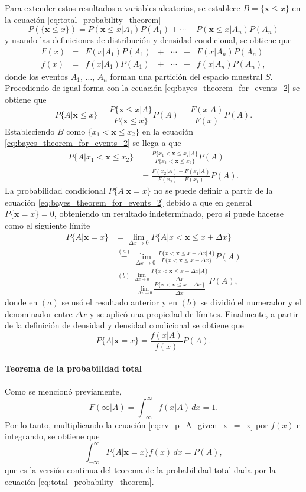 \documentclass[a4paper]{report}
\newcommand{\x}{\mathbf{x}}
\begin{document}
Para extender estos resultados a variables aleatorias, se establece \(B=\{\x\leq x\}\) en la ecuación \ref{eq:total_probability_theorem}
\[
 P(\{\x\leq x\})=P(\x\leq x|A_1)P(A_1)+\cdots+P(\x\leq x|A_n)P(A_n)
\]
y usando las definiciones de distribución y densidad condicional, se obtiene que
\[
\begin{array}{lllllll}
 F(x)&=&F(x|A_1)P(A_1)&+&\cdots&+&F(x|A_n)P(A_n)\\
 f(x)&=&f(x|A_1)P(A_1)&+&\cdots&+&f(x|A_n)P(A_n),
 \end{array}
\]
donde los eventos \(A_1,\,\dots,\,A_n\) forman una partición del espacio muestral \(S\). Procediendo de igual forma con la ecuación \ref{eq:bayes_theorem_for_events_2} se obtiene que
\[
 P\{A|\x\leq x\}=\frac{P\{\x\leq x|A\}}{P\{\x\leq x\}}P(A)=\frac{F(x|A)}{F(x)}P(A).
\]
Estableciendo \(B\) como \(\{x_1<\x\leq x_2\}\) en la ecuación \ref{eq:bayes_theorem_for_events_2} se llega a que
\begin{align*}
 P\{A|x_1<\x\leq x_2\}&=\frac{P\{x_1<\x\leq x_2|A\}}{P\{x_1<\x\leq x_2\}}P(A)\\
    &=\frac{F(x_2|A)-F(x_1|A)}{F(x_2)-F(x_1)}P(A).
\end{align*}
La probabilidad condicional \(P\{A|\x = x\}\) no se puede definir a partir de la ecuación \ref{eq:bayes_theorem_for_events_2} debido a que en general \(P\{\x = x\}=0\), obteniendo un resultado indeterminado, pero si puede hacerse como el siguiente límite
\begin{align*}
 P\{A|\x = x\}&=\lim_{\Delta x\to 0} P\{A|x<\x\leq x+\Delta x\}\\
   &\overset{(a)}{=}\lim_{\Delta x\to 0}\frac{P\{x<\x\leq x+\Delta x|A\}}{P\{x<\x\leq x+\Delta x\}}P(A)\\
   &\overset{(b)}{=}\frac{\lim\limits_{\Delta x\to 0} \dfrac{P\{x<\x\leq x+\Delta x|A\}}{\Delta x}}{\lim\limits_{\Delta x\to 0} \dfrac{P\{x<\x\leq x+\Delta x\}}{\Delta x}}P(A),
\end{align*}
donde en \((a)\) se usó el resultado anterior y en \((b)\) se dividió el numerador y el denominador entre \(\Delta x\) y se aplicó una propiedad de límites. Finalmente, a partir de la definición de densidad y densidad condicional se obtiene que
\begin{equation}\label{eq:rv_p_A_given_x_=_x}
 P\{A|\x = x\}=\frac{f(x|A)}{f(x)}P(A).
\end{equation}

\paragraph{Teorema de la probabilidad total} Como se mencionó previamente, 
\[
 F(\infty|A)=\int_{-\infty}^{\infty}f(x|A)\,dx=1.
\]
Por lo tanto, multiplicando la ecuación \ref{eq:rv_p_A_given_x_=_x} por \(f(x)\) e integrando, se obtiene que
\begin{equation}\label{eq:total_probability_theorem_continuous}
 \int_{-\infty}^{\infty}P\{A|\x = x\}f(x)\,dx=P(A),
\end{equation}
que es la versión continua del teorema de la probabilidad total dada por la ecuación \ref{eq:total_probability_theorem}.
\end{document}
